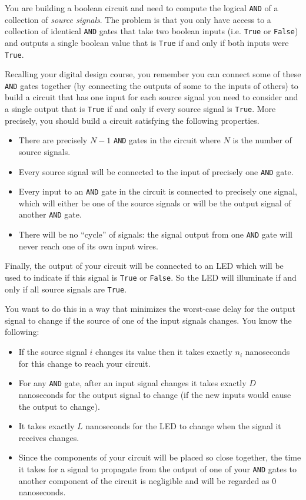 
You are building a boolean circuit and need to compute the logical \texttt{AND} of a collection of {\em source signals}.
The problem is that you only have access to a collection of identical \texttt{AND} gates that take two boolean inputs (i.e. \texttt{True} or \texttt{False})
and outputs a single boolean value that is \texttt{True} if and only if both inputs were \texttt{True}.

Recalling your digital design course, you remember you can connect some of these \texttt{AND} gates together (by connecting the outputs of some to the inputs of others)
to build a circuit that has one input for each source signal you need to consider and a single output that is \texttt{True} if and only if
every source signal is \texttt{True}. More precisely, you should build a circuit satisfying the following properties.
\begin{itemize}
  \item There are precisely $N-1$ \texttt{AND} gates in the circuit where $N$ is the number of source signals.
  \item Every source signal will be connected to the input of precisely one \texttt{AND} gate.
  \item Every input to an \texttt{AND} gate in the circuit is connected to precisely one signal, which will either be one of the
  source signals or will be the output signal of another \texttt{AND} gate.
  \item There will be no ``cycle'' of signals: the signal output from one \texttt{AND} gate will never reach one of its own input wires.
\end{itemize}
Finally, the output of your circuit will be connected to an LED which will be used to indicate if this signal is \texttt{True} or \texttt{False}.
So the LED will illuminate if and only if all source signals are \texttt{True}.

You want to do this in a way that minimizes the worst-case delay for the output signal to change if the source of one of the input signals changes.
You know the following:
\begin{itemize}
  \item If the source signal $i$ changes its value then it takes exactly $n_i$ nanoseconds
for this change to reach your circuit.
  \item For any \texttt{AND} gate, after an input signal changes it takes exactly $D$ nanoseconds for the output signal
  to change (if the new inputs would cause the output to change).
  \item It takes exactly $L$ nanoseconds for the LED to change when the signal it receives changes.
  \item Since the components of your circuit will be placed so close together, the time it takes for a signal to propagate from the output of one of your \texttt{AND} gates to another component of the circuit
  is negligible and will be regarded as $0$ nanoseconds.
\end{itemize}

